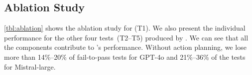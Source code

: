 \begin{table}[t]
{\begin{tabular}{llrrr}
\end{tabular}}
\label{tbl:otter}
\end{table}


\subsection{Ablation Study}
\label{sec:rq2}

\cref{tbl:ablation} shows the ablation study for \solx (T1). We also present the
individual performance for the other four tests~(T2--T5) produced by \soly. We
can see that all the components contribute to \solx's performance. Without
action planning, we lose more than 14\%--20\% of fail-to-pass tests for GPT-4o
and 21\%--36\% of the tests for Mistral-large.

